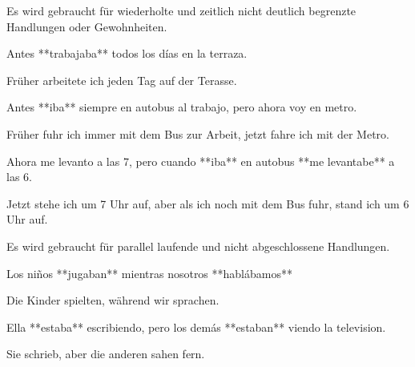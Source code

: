 \begin{highlight}
    Es wird gebraucht für wiederholte und zeitlich nicht deutlich begrenzte Handlungen oder Gewohnheiten.
\end{highlight}

\begin{compactitem}
    \item  Antes **trabajaba** todos los días en la terraza.
    \begin{compactitem}\itshape
        \item Früher arbeitete ich jeden Tag auf der Terasse.
    \end{compactitem}
    \item Antes **iba** siempre en autobus al trabajo, pero ahora voy en metro.
    \begin{compactitem}\itshape
        \item Früher fuhr ich immer mit dem Bus zur Arbeit, jetzt fahre ich mit der Metro.
    \end{compactitem}
    \item Ahora me levanto a las 7, pero cuando **iba** en autobus **me levantabe** a las 6.
    \begin{compactitem}\itshape
        \item Jetzt stehe ich um 7 Uhr auf, aber als ich noch mit dem Bus fuhr, stand ich um 6 Uhr auf.
    \end{compactitem}
\end{compactitem}


\begin{highlight}
    Es wird gebraucht für parallel laufende und nicht abgeschlossene Handlungen.
\end{highlight}

\begin{compactitem}
    \item  Los niños **jugaban** mientras nosotros **hablábamos**
    \begin{compactitem}\itshape
        \item Die Kinder spielten, während wir sprachen.
    \end{compactitem}
    \item Ella **estaba** escribiendo, pero los demás **estaban** viendo la television.
    \begin{compactitem}\itshape
        \item Sie schrieb, aber die anderen sahen fern.
    \end{compactitem}
\end{compactitem}


